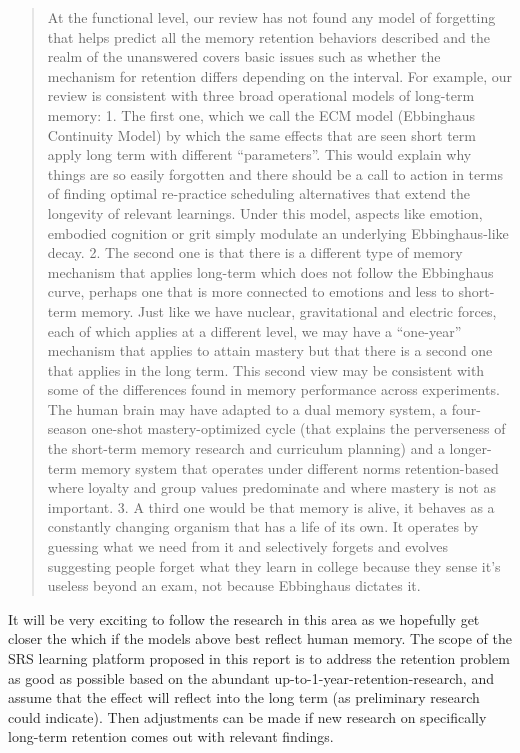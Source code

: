 \begin{quote}
At the functional level, our review has not found any model of
forgetting that helps predict all the memory retention behaviors
described and the realm of the unanswered covers basic issues such as
whether the mechanism for retention differs depending on the interval.
For example, our review is consistent with three broad operational
models of long-term memory: 1. The first one, which we call the ECM
model (Ebbinghaus Continuity Model) by which the same effects that are
seen short term apply long term with different ``parameters''. This
would explain why things are so easily forgotten and there should be a
call to action in terms of finding optimal re-practice scheduling
alternatives that extend the longevity of relevant learnings. Under this
model, aspects like emotion, embodied cognition or grit simply modulate
an underlying Ebbinghaus-like decay. 2. The second one is that there is
a different type of memory mechanism that applies long-term which does
not follow the Ebbinghaus curve, perhaps one that is more connected to
emotions and less to short-term memory. Just like we have nuclear,
gravitational and electric forces, each of which applies at a different
level, we may have a ``one-year'' mechanism that applies to attain
mastery but that there is a second one that applies in the long term.
This second view may be consistent with some of the differences found in
memory performance across experiments. The human brain may have adapted
to a dual memory system, a four-season one-shot mastery-optimized cycle
(that explains the perverseness of the short-term memory research and
curriculum planning) and a longer-term memory system that operates under
different norms retention-based where loyalty and group values
predominate and where mastery is not as important. 3. A third one would
be that memory is alive, it behaves as a constantly changing organism
that has a life of its own. It operates by guessing what we need from it
and selectively forgets and evolves suggesting people forget what they
learn in college because they sense it's useless beyond an exam, not
because Ebbinghaus dictates it.
\end{quote}

It will be very exciting to follow the research in this area as we
hopefully get closer the which if the models above best reflect human
memory. The scope of the SRS learning platform proposed in this report
is to address the retention problem as good as possible based on the
abundant up-to-1-year-retention-research, and assume that the effect
will reflect into the long term (as preliminary research could
indicate). Then adjustments can be made if new research on specifically
long-term retention comes out with relevant findings.

